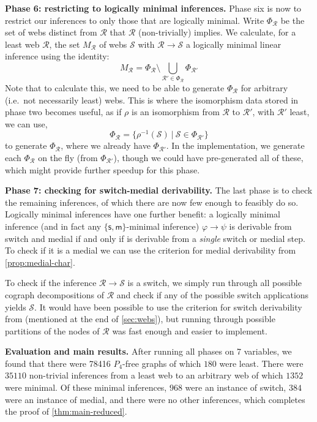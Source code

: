 \documentclass[a4paper, UKenglish, cleveref]{lipics-v2021}
\renewcommand{\phi}{\varphi}
\newcommand{\R}{\ensuremath{\mathcal{R}}}
\renewcommand*{\S}{\ensuremath{\mathcal{S}}}
\newcommand{\m}{\ensuremath{\mathsf{m}}}
\newcommand{\s}{\ensuremath{\mathsf{s}}}
\begin{document}
\smallskip

\textbf{Phase 6: restricting to logically minimal inferences.}
Phase six is now to restrict our inferences to only those that are logically minimal. Write \(\Phi_\R \) be the set of webs distinct from $\R$ that \(\R \) (non-trivially) implies.
We calculate, for a least web $\R$, the set $M_\R$ of webs $\S$ with $\R \to \S$ a logically minimal linear inference using the identity:
\begin{equation*}
  M_\R = \Phi_\R \setminus \bigcup_{\R' \in \Phi_{\R}} \Phi_{\R'}
\end{equation*}
Note that to calculate this, we need to be able to generate \(\Phi_\R\) for arbitrary (i.e.\ not necessarily least) webs. This is where the isomorphism data stored in phase two becomes useful, as if \(\rho \) is an isomorphism from $\R$ to $\R'$, with \(\R'\) least, we can use,
\begin{equation*}
  \Phi_\R = \{ \rho^{-1}(\S) \ |\  \S \in \Phi_{\R'}\}
\end{equation*}
to generate \(\Phi_\R\), where we already have \(\Phi_{\R'}\). In the implementation, we generate each \(\Phi_\R\) on the fly (from \(\Phi_{\R'}\)), though we could have pre-generated all of these, which might provide further speedup for this phase.
%

\smallskip

\textbf{Phase 7: checking for switch-medial derivability.}
The last phase is to check the remaining inferences, of which there are now few enough to feasibly do so. Logically minimal inferences have one further benefit: a logically minimal inference (and in fact any \(\{\s,\m\}\)-minimal inference) \(\phi \to \psi\) is derivable from switch and medial if and only if is derivable from a \emph{single} switch or medial step. To check if it is a medial we can use the criterion for medial derivability from \cref{prop:medial-char}.

To check if the inference \(\R \to \S\) is a switch, we simply run through all possible cograph decompositions of \(\R\) and check if any of the possible switch applications yields \(\S\).
It would have been possible to use the criterion for switch derivability from \cite{Str07:char-med} (mentioned at the end of \cref{sec:webs}), but running through possible partitions of the nodes of \(\R\) was fast enough and easier to implement.

\smallskip

\textbf{Evaluation and main results.}
After running all phases on 7 variables, we found that there were 78416 \(P_4\)-free graphs of which \(180\) were least. There were \(35110\) non-trivial inferences from a least web to an arbitrary web of which \(1352\) were minimal. Of these minimal inferences, \(968\) were an instance of switch, \(384\) were an instance of medial, and there were no other inferences, which completes the proof of \cref{thm:main-reduced}.
\end{document}
